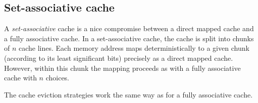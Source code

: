 \subsection{Set-associative cache}

A \emph{set-associative} cache is a nice compromise between a direct mapped
cache and a fully associative cache. In a set-associative cache, the cache is
split into chunks of $n$ cache lines. Each memory address maps deterministically
to a given chunk (according to its least significant bits) precisely as a direct
mapped cache. However, within this chunk the mapping proceeds as with a fully
associative cache with $n$ choices.

The cache eviction strategies work the same way as for a fully associative
cache.

